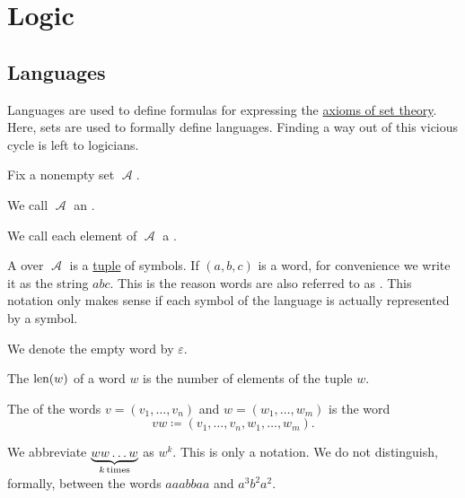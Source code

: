 \section{Logic}\label{sec:logic}
\subsection{Languages}\label{subsec:languages}

\begin{remark}\label{rem:language_definitions_using_sets}
  Languages are used to define formulas for expressing the \hyperref[def:set_zfc]{axioms of set theory}. Here, sets are used to formally define languages. Finding a way out of this vicious cycle is left to logicians.
\end{remark}

\begin{definition}\label{def:language}
  Fix a nonempty set \( \mscrA \).

  \begin{DefEnum}
     We call \( \mscrA \) an .

     We call each element of \( \mscrA \) a .

     A  over \( \mscrA \) is a \hyperref[def:cartesian_product]{tuple} of symbols. If \( (a, b, c) \) is a word, for convenience we write it as the string \( abc \). This is the reason words are also referred to as . This notation only makes sense if each symbol of the language is actually represented by a symbol.

     We denote the empty word by \( \varepsilon \).

     The  \( \operatorname{len}(w) \) of a word \( w \) is the number of elements of the tuple \( w \).

     The  of the words \( v = (v_1, \ldots, v_n) \) and \( w = (w_1, \ldots, w_m) \) is the word
    \begin{equation*}
      vw \coloneqq (v_1, \ldots, v_n, w_1, \ldots, w_m).
    \end{equation*}

    We abbreviate \( \underbrace{w w \ldots w}_{k \mathop{\text{times}}} \) as \( w^k \). This is only a notation. We do not distinguish, formally, between the words \( aaabbaa \) and \( a^3 b^2 a^2 \).


\end{DefEnum}
\end{definition}
